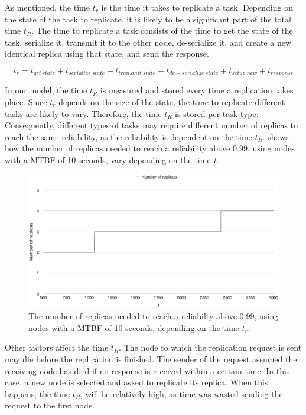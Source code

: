 \documentclass{cslthse-msc}
\begin{document}
As mentioned, the time $t_r$ is the time it takes to replicate a task. Depending on the state of the task to replicate, it is likely to be a significant part of the total time $t_R$. The time to replicate a task consists of the time to get the state of the task, serialize it, transmit it to the other node, de-serialize it, and create a new identical replica using that state, and send the response. 

\begin{equation} \label{eq:replication_time}
t_{r} = t_{get\ state} + t_{serialize\ state} + t_{transmit\ state} + t_{de-serialize\ state} + t_{setup\ new} + t_{response}
\end{equation} 

In our model, the time $t_{R}$ is measured and stored every time a replication takes place. Since $t_{r}$ depends on the size of the state, the time to replicate different tasks are likely to vary. Therefore, the time $t_{R}$ is stored per task type. Consequently, different types of tasks may require different number of replicas to reach the same reliability, as the reliability is dependent on the time $t_R$.  shows how the number of replicas needed to reach a reliability above 0.99, using nodes with a MTBF of 10 seconds, vary depending on the time \emph{t}.

\begin{figure}[!hbt]
\centering
\includegraphics[scale=0.5]{images/replicas_depending_on_t.pdf}
\caption{The number of replicas needed to reach a reliabilty above 0.99, using nodes with a MTBF of 10 seconds, depending on the time $t_{r}$.}\label{fig:replicas_depending_on_t}
\end{figure}


Other factors affect the time $t_R$. The node to which the replication request is sent may die before the replication is finished. The sender of the request assumed the receiving node has died if no response is received within a certain time. In this case, a new node is selected and asked to replicate its replica. When this happens, the time $t_R$, will be relatively high, as time was wasted sending the request to the first node. 
\end{document}
